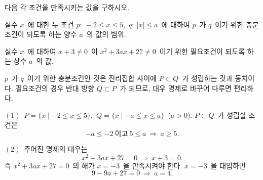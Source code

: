 \documentclass[10pt]{article}
\begin{document}

\newpage


\begin{dmproblem}
다음 각 조건을 만족시키는 값을 구하시오.

\vspace{3mm}
 실수 $x$\ 에 대한 두 조건 $p:\ -2 \le x \le 5$,\ $q:\ |x| \le a$\ 에 대하여 $p$\ 가 $q$\ 이기 위한 충분조건이 되도록 하는 양수 $a$\ 의 값의 범위.

\vspace{3mm}
 실수 $x$\ 에 대하여 $x + 3 \ne 0$\ 이 $x^{2} + 3ax + 27 \ne 0$\ 이기 위한 필요조건이 되도록 하는 상수 $a$\ 의 값.
\end{dmproblem}

\begin{dmapproach}
$p$\ 가 $q$\ 이기 위한 충분조건인 것은 진리집합 사이에 $P \subset Q$\ 가 성립하는 것과 동치이다. 필요조건의 경우 반대 방향 $Q \subset P$\ 가 되므로, 대우 명제로 바꾸어 다루면 편리하다.
\end{dmapproach}

\begin{dmsolution}
$(1)$\ $P = \{x \mid -2 \le x \le 5\}$,\ $Q = \{x \mid -a \le x \le a\}$\ ($a > 0$).
$P \subset Q$\ 가 성립할 조건은
\[ -a \le -2\ \text{이고}\ 5 \le a\ \Longrightarrow\ a \ge 5. \]

$(2)$\ 주어진 명제의 대우는
\[ x^{2} + 3ax + 27 = 0\ \Longrightarrow\ x + 3 = 0. \]
즉 $x^{2} + 3ax + 27 = 0$\ 의 해가 $x = -3$\ 을 만족시켜야 한다. $x = -3$\ 을 대입하면
\[ 9 - 9a + 27 = 0\ \Longrightarrow\ a = 4. \]
\end{dmsolution}

\dmchecktitle


\end{document}

